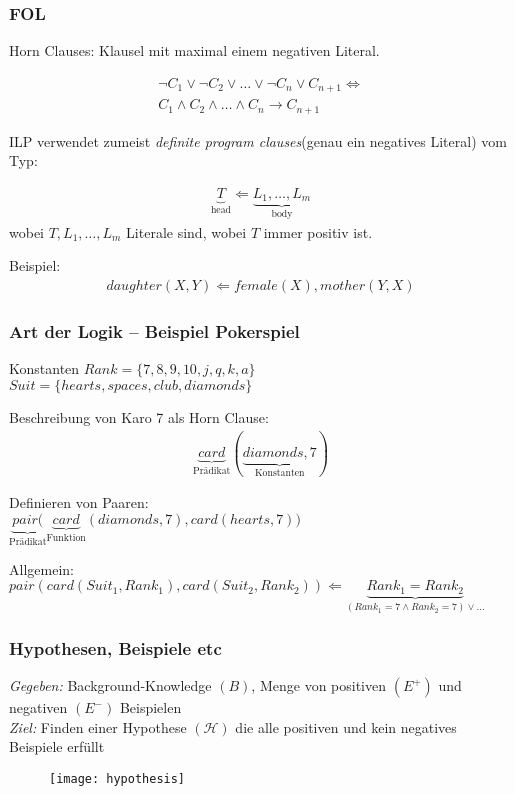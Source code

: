 \begin{frame}
	\frametitle{FOL}
	Horn Clauses: Klausel mit maximal einem negativen Literal.

	\begin{align*}
		\neg C_1 \vee \neg C_2 \vee \ldots \vee \neg C_n  \vee C_{n+1} \Leftrightarrow\\
		C_1 \wedge C_2 \wedge \ldots \wedge C_n  \rightarrow C_{n+1}
	\end{align*}

	ILP verwendet zumeist \textit{definite program clauses}(genau ein negatives Literal) vom Typ:

	\begin{align*}
		\underbrace{T}_{\text{head}} \Leftarrow \underbrace{L_1, \ldots, L_m}_{\text{body}}
	\end{align*}
	wobei $T, L_1, \ldots, L_m$ Literale sind, wobei $T$ immer positiv ist.

	Beispiel:
	\begin{align*}
		daughter(X,Y) \Leftarrow female(X), mother(Y, X)
	\end{align*}
\end{frame}

\begin{frame}
	\frametitle{Art der Logik -- Beispiel Pokerspiel}

	\begin{block}{Konstanten}
		$Rank = \{7,8,9,10,j,q,k,a\}$\\
	    $Suit = \{hearts, spaces, club, diamonds\}$
	\end{block}
	
	Beschreibung von Karo 7 als Horn Clause:
	\begin{align*}
		\underbrace{card}_{\text{Prädikat}}(\underbrace{diamonds, 7}_{\text{Konstanten}})
	\end{align*}

	Definieren von Paaren:\\
	$\underbrace{pair(}_{\text{Prädikat}}\underbrace{card}_{\text{Funktion}}(diamonds, 7),
	card(hearts, 7))$

	Allgemein:\\
	$pair(card(Suit_1, Rank_1),card(Suit_2, Rank_2)) \Leftarrow \underbrace{Rank_1 =
	Rank_2}_{(Rank_1=7 \wedge Rank_2=7) \vee \ldots}$

	
\end{frame}

\begin{frame}
\frametitle{Hypothesen, Beispiele etc}
	\emph{Gegeben:} Background-Knowledge $(B)$, Menge von positiven $(E^+)$ und negativen $(E^-)$ Beispielen\\
	\emph{Ziel:} Finden einer Hypothese $(\mathcal{H})$ die alle positiven und kein negatives Beispiele erfüllt
\begin{figure}[H]
	\centering
	\texttt{[image: hypothesis]}
\end{figure}
\end{frame}
